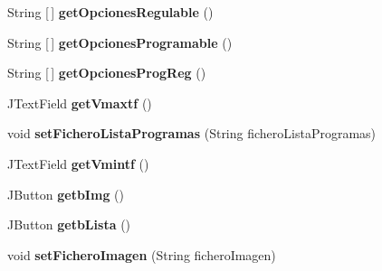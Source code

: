 \begin{DoxyCompactItemize}
String \mbox{[}$\,$\mbox{]} {\bfseries get\+Opciones\+Regulable} ()
\item 
\mbox{\label{classvista_1_1_dialogo_a_xC3_xB1adir_editar_e_d_a454167bccc99ac3a89b5a2a4104d25ab}} 
String \mbox{[}$\,$\mbox{]} {\bfseries get\+Opciones\+Programable} ()
\item 
\mbox{\label{classvista_1_1_dialogo_a_xC3_xB1adir_editar_e_d_a2773d9feaddd2fceefd790236c5fef53}} 
String \mbox{[}$\,$\mbox{]} {\bfseries get\+Opciones\+Prog\+Reg} ()
\item 
\mbox{\label{classvista_1_1_dialogo_a_xC3_xB1adir_editar_e_d_ab09d8c7bdcd4ec1669ea75748fdaccc1}} 
J\+Text\+Field {\bfseries get\+Vmaxtf} ()
\item 
\mbox{\label{classvista_1_1_dialogo_a_xC3_xB1adir_editar_e_d_a95a4db4b81684e42edc4cb68906d56a3}} 
void {\bfseries set\+Fichero\+Lista\+Programas} (String fichero\+Lista\+Programas)
\item 
\mbox{\label{classvista_1_1_dialogo_a_xC3_xB1adir_editar_e_d_a4ee7c1d76677e9870ea40819f7354684}} 
J\+Text\+Field {\bfseries get\+Vmintf} ()
\item 
\mbox{\label{classvista_1_1_dialogo_a_xC3_xB1adir_editar_e_d_a17ccb4ab4bde3e3709b92e1528a068bf}} 
J\+Button {\bfseries getb\+Img} ()
\item 
\mbox{\label{classvista_1_1_dialogo_a_xC3_xB1adir_editar_e_d_a88611d926b8c42d19ab1644570190a08}} 
J\+Button {\bfseries getb\+Lista} ()
\item 
\mbox{\label{classvista_1_1_dialogo_a_xC3_xB1adir_editar_e_d_a18b53c8b25fb4c85f3dd4293720d3ecd}} 
void {\bfseries set\+Fichero\+Imagen} (String fichero\+Imagen)
\item 
\mbox{\label{classvista_1_1_dialogo_a_xC3_xB1adir_editar_e_d_acd30bec076e407584365c29aa9d48bc6}} 

\end{DoxyCompactItemize}

